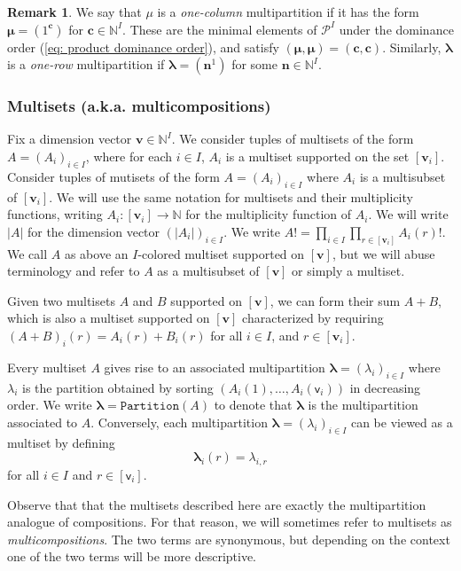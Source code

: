 \documentclass[11pt,reqno]{amsart}
\renewcommand{\mathbf}{\mathbold}
\numberwithin{equation}{section}
\theoremstyle{definition}
\newtheorem{Remark}[equation]{Remark}
\newcommand{\cP}{\mathcal{P}}
\newcommand{\bc}{\mathbf{c}}
\newcommand{\bn}{\mathbf{n}}
\newcommand{\bv}{\mathbf{v}}
\newcommand{\NN}{\mathbb{N}}
\renewcommand{\bv}{\mathbf{v}} %
\newcommand{\sv}{\mathsf{v}}
\newcommand{\vertexset}{I}
\newcommand{\Partitions}{\cP}
\newcommand{\bla}{{\boldsymbol{\lambda}}}
\newcommand{\bmu}{{\boldsymbol{\mu}}}
\newcommand{\Partition}{\mathtt{Partition}}
\begin{document}
\begin{Remark}
\label{rmk: one-column}
We say that $\mu$ is a \emph{one-column} multipartition if it has the form $\bmu = (1^{\bc})$ for  $\bc \in \NN^\vertexset$.
 These are the minimal elements of $\Partitions^\vertexset$ under the  dominance order (\ref{eq: product dominance order}), and satisfy $ ( \bmu, \bmu) = (\bc, \bc)$.  Similarly, $\bla$ is a  \emph{one-row} multipartition if $\bla = (\bn^1)$ for some $\bn \in \NN^\vertexset$.
\end{Remark}


\subsubsection{Multisets (a.k.a. multicompositions) }
\label{subsubsec:multisets}
Fix a dimension vector $\bv \in \NN^I$. We consider tuples of multisets of the form $A = (A_i)_{i \in I}$, where for each $i \in I$, $A_i$ is a multiset supported on the set $[\bv_i]$. Consider tuples of mutisets of the form $A = (A_i)_{i \in I}$ where $A_i$ is a multisubset of $[\bv_i]$. We will use the same notation for multisets and their multiplicity functions, writing $A_i : [\bv_i] \rightarrow \NN$ for the multiplicity function of $A_i$. We will write $|A|$ for the dimension vector $(|A_i|)_{i \in I}$.
We write $A! = \prod_{i\in I} \prod_{r \in [\bv_i]} A_i(r)!$. We call $A$ as above an $I$-colored multiset supported on $[\bv]$, but we will abuse terminology and refer to $A$ as a multisubset of $[\bv]$ or simply a multiset.

Given two multisets $A$ and $B$ supported on $[\bv]$, we can form their sum $A + B$, which is also a multiset supported on $[\bv]$ characterized by requiring $(A+B)_i(r) = A_i(r) + B_i(r)$ for all $i\in I$, and $r \in [\bv_i]$.

Every multiset $A$ gives rise to an associated multipartition $\bla = (\lambda_i)_{i \in I}$ where $\lambda_i$ is the partition obtained by sorting $(A_i(1),\ldots, A_i(\sv_i))$ in decreasing order. We write $\bla = \Partition(A)$ to denote that $\bla$ is the multipartition associated to $A$. Conversely, each multipartition $\bla = (\lambda_i)_{i \in I}$ can be viewed as a multiset by defining
\begin{equation}
  \label{eq:17}
  \bla_i(r) = \lambda_{i,r}
\end{equation}
for all $i \in I$ and $r \in [\sv_i]$.

Observe that that the multisets described here are exactly the multipartition analogue of compositions. For that reason, we will sometimes refer to multisets as \emph{multicompositions}. The two terms are synonymous, but depending on the context one of the two terms will be more descriptive.
\end{document}
